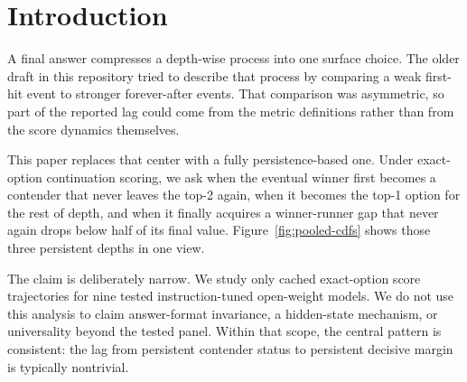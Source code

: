 \section{Introduction}

A final answer compresses a depth-wise process into one surface choice. The older draft in this repository tried to describe that process by comparing a weak first-hit event to stronger forever-after events. That comparison was asymmetric, so part of the reported lag could come from the metric definitions rather than from the score dynamics themselves.

This paper replaces that center with a fully persistence-based one. Under exact-option continuation scoring, we ask when the eventual winner first becomes a contender that never leaves the top-2 again, when it becomes the top-1 option for the rest of depth, and when it finally acquires a winner-runner gap that never again drops below half of its final value. Figure~\ref{fig:pooled-cdfs} shows those three persistent depths in one view.

The claim is deliberately narrow. We study only cached exact-option score trajectories for nine tested instruction-tuned open-weight models. We do not use this analysis to claim answer-format invariance, a hidden-state mechanism, or universality beyond the tested panel. Within that scope, the central pattern is consistent: the lag from persistent contender status to persistent decisive margin is typically nontrivial.

